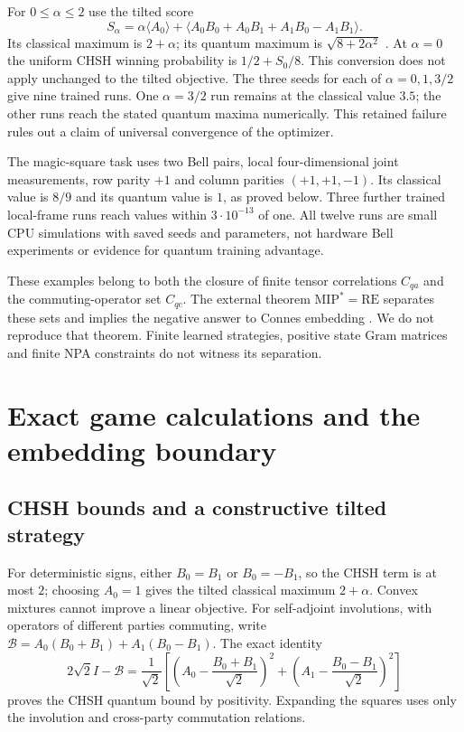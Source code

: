 \documentclass[11pt]{article}
\theoremstyle{definition}\newtheorem{definition}[theorem]{Definition}
\theoremstyle{remark}\newtheorem{remark}[theorem]{Remark}
\begin{document}
For $0\le\alpha\le2$ use the tilted score
\[
 S_\alpha=\alpha\langle A_0\rangle+
 \langle A_0B_0+A_0B_1+A_1B_0-A_1B_1\rangle.
\]
Its classical maximum is $2+\alpha$; its quantum maximum is
$\sqrt{8+2\alpha^2}$ \cite{GameTilted}. At $\alpha=0$ the uniform CHSH winning
probability is $1/2+S_0/8$. This conversion does not apply unchanged to the
tilted objective. The three seeds for each of $\alpha=0,1,3/2$ give nine
trained runs. One $\alpha=3/2$ run remains at the classical value $3.5$;
the other runs reach the stated quantum maxima numerically. This retained
failure rules out a claim of universal convergence of the optimizer.

The magic-square task uses two Bell pairs, local four-dimensional joint
measurements, row parity $+1$ and column parities $(+1,+1,-1)$. Its classical
value is $8/9$ and its quantum value is $1$, as proved below. Three further
trained local-frame runs reach values within $3\cdot10^{-13}$ of one.
All twelve runs are small CPU simulations with saved seeds and parameters,
not hardware Bell experiments or evidence for quantum training advantage.

These examples belong to both the closure of finite tensor correlations
$C_{qa}$ and the commuting-operator set $C_{qc}$. The external theorem
$\mathrm{MIP}^*=\mathrm{RE}$ separates these sets and implies the negative
answer to Connes embedding \cite{GameMIP}. We do not reproduce that theorem.
Finite learned strategies, positive state Gram matrices and finite NPA
constraints do not witness its separation.

\section{Exact game calculations and the embedding boundary}
\subsection{CHSH bounds and a constructive tilted strategy}
For deterministic signs, either $B_0=B_1$ or $B_0=-B_1$, so the CHSH term is
at most $2$; choosing $A_0=1$ gives the tilted classical maximum $2+\alpha$.
Convex mixtures cannot improve a linear objective. For self-adjoint
involutions, with operators of different parties commuting, write
$\mathcal B=A_0(B_0+B_1)+A_1(B_0-B_1)$. The exact identity
\[
 2\sqrt2I-\mathcal B=\frac1{\sqrt2}
 \left[\left(A_0-\frac{B_0+B_1}{\sqrt2}\right)^2+
       \left(A_1-\frac{B_0-B_1}{\sqrt2}\right)^2\right]
\]
proves the CHSH quantum bound by positivity. Expanding the squares uses only
the involution and cross-party commutation relations.
\end{document}
